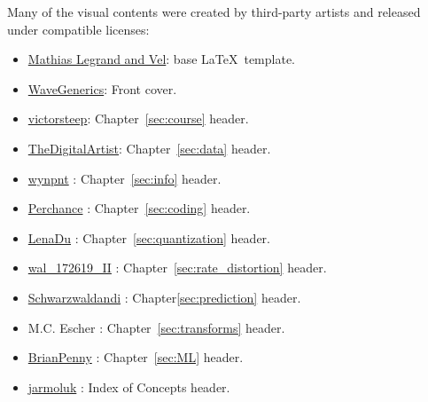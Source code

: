 \noindent Many of the visual contents were created by third-party artists and released under compatible licenses:
\begin{itemize}
\item \href{https://www.overleaf.com/latex/templates/the-legrand-orange-book-template-english/jtctyfmnpppc}{Mathias Legrand and Vel}: base \LaTeX\ template.
\item \href{https://pixabay.com/illustrations/live-transmission-electricity-7684647/}{WaveGenerics}: Front cover.
\item \href{https://pixabay.com/users/victorsteep-9526460/}{victorsteep}: Chapter~\ref{sec:course} header.
\item \href{https://pixabay.com/illustrations/big-data-data-information-binary-7186533/}{TheDigitalArtist}: Chapter~\ref{sec:data} header.
\item \href{https://pixabay.com/illustrations/big-data-analytics-information-2001190/}{wynpnt} : Chapter~\ref{sec:info} header.
\item \href{https://perchance.org/ai-text-to-image-generator}{Perchance} : Chapter~\ref{sec:coding} header.
\item \href{https://pixabay.com/photos/night-light-stairs-3839649/}{LenaDu} : Chapter~\ref{sec:quantization} header.
\item \href{https://pixabay.com/photos/water-reflections-abstract-colours-7456116/}{wal\_172619\_II} : Chapter~\ref{sec:rate_distortion} header.
\item \href{https://pixabay.com/photos/glass-ball-ball-sphere-lights-5979241/}{Schwarzwaldandi} : Chapter\ref{sec:prediction} header.
\item M.C. Escher : Chapter~\ref{sec:transforms} header.
\item \href{https://pixabay.com/illustrations/ai-generated-face-8540923/}{BrianPenny} : Chapter~\ref{sec:ML} header.
\item \href{https://pixabay.com/photos/list-surnames-table-personal-data-428312/}{jarmoluk} : Index of Concepts header.
\end{itemize}

\vfill

